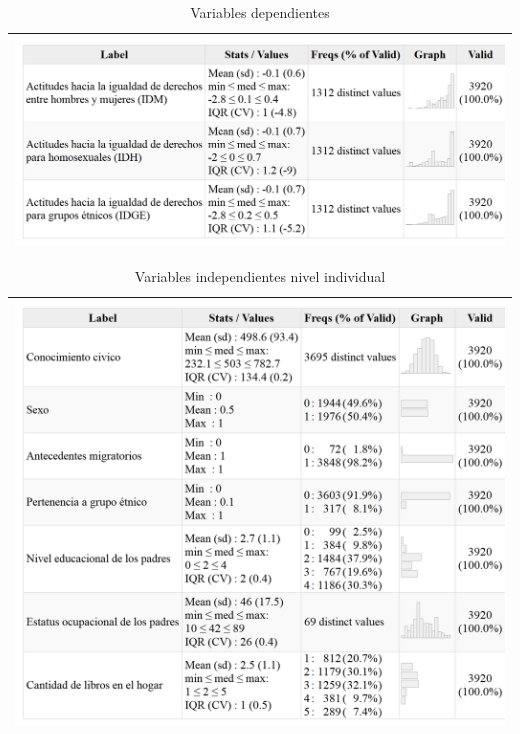 \documentclass[12pt,twoside]{templates/facsothesis}
\begin{document}
\begin{longtable}[]{@{}l@{}}
\caption{\label{tab:unnamed-chunk-6}Variables dependientes}\tabularnewline
\toprule
\endhead
\includegraphics[width=\textwidth,height=0.5\textheight]{input/images/desc01_dep.png} \\
\bottomrule
\end{longtable}

\begin{longtable}[]{@{}l@{}}
\caption{\label{tab:unnamed-chunk-7}Variables independientes nivel individual}\tabularnewline
\toprule
\endhead
\includegraphics[width=\textwidth,height=0.5\textheight]{input/images/desc01_indep_ind.png} \\
\bottomrule
\end{longtable}
\end{document}
